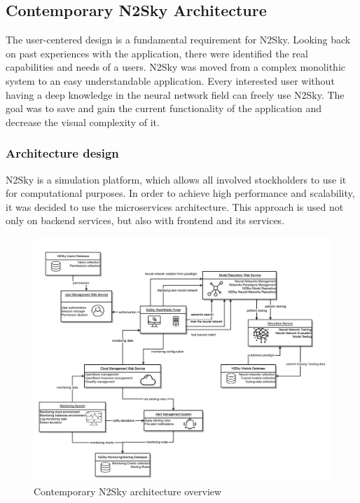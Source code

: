 \subsection{Contemporary N2Sky Architecture}\label{Contemporary N2Sky Architecture}

The user-centered design is a fundamental requirement for N2Sky. Looking back on past experiences with the application, there were identified the real capabilities and needs of a users. N2Sky was moved from a complex monolithic system to an easy understandable application. Every interested user without having a deep knowledge in the neural network field can freely use N2Sky.  The goal was to save and gain the current functionality of the application and decrease the visual complexity of it. 

\subsubsection{Architecture design}

N2Sky is a simulation platform, which allows all involved stockholders to use it for computational purposes. In order to achieve high performance and scalability, it was decided to use the microservices architecture. This approach is used not only on backend services, but also with frontend and its services. 

\begin{figure}[htbp]
\begin{center}
  \includegraphics[width=\linewidth]{components/2/new_arch.png}
  \caption{Contemporary N2Sky architecture overview}
  \label{fig:newarch}
\end{center}
\end{figure}

